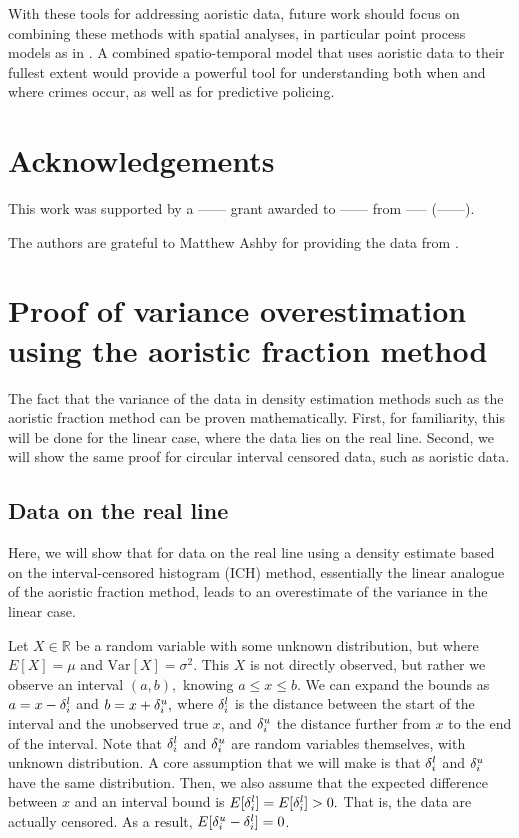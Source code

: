 With these tools for addressing aoristic data, future work should focus on combining these methods with spatial analyses, in particular point process models as in \citet{wang2014modeling}. A combined spatio-temporal model that uses aoristic data to their fullest extent would provide a powerful tool for understanding both when and where crimes occur, as well as for predictive policing.

\section{Acknowledgements}

This work was supported by a ------ grant awarded to ------ from ----- (------).

The authors are grateful to Matthew Ashby for providing the data from \citet{ashby2013comparison}.




\newpage

\appendix



\section{Proof of variance overestimation using the aoristic fraction method} \label{proofvar}


The fact that the variance of the data in density estimation methods such as the aoristic fraction method can be proven mathematically. First, for familiarity, this will be done for the linear case, where the data lies on the real line. Second, we will show the same proof for circular interval censored data, such as aoristic data.

\subsection{Data on the real line} \label{proofreal}

Here, we will show that for data on the real line using a density estimate based on the interval-censored histogram (ICH) method, essentially the linear analogue of the aoristic fraction method, leads to an overestimate of the variance in the linear case.

Let $X \in \mathbb{R}$ be a random variable with some unknown distribution, but where $E[X] = \mu$ and $\text{Var}[X] = \sigma^2$. This $X$ is not directly observed, but rather we observe an interval $(a, b),$ knowing $a \leq x \leq b$. We can expand the bounds as $a = x - {\delta^l_i}$ and $b = x + {\delta^u_i},$ where ${\delta^l_i}$ is the distance between the start of the interval and the unobserved true $x$, and ${\delta^u_i}$ the distance further from $x$ to the end of the interval. Note that ${\delta^l_i}$ and ${\delta^u_i}$  are random variables themselves, with unknown distribution. A core assumption that we will make is that ${\delta^l_i}$ and ${\delta^u_i}$ have the same distribution. Then, we also assume that the expected difference between $x$ and an interval bound is $E[{\delta^l_i}] = E[{\delta^l_i}] > 0.$ That is, the data are actually censored. As a result, $E[{\delta^u_i} - {\delta^l_i}] = 0$.


